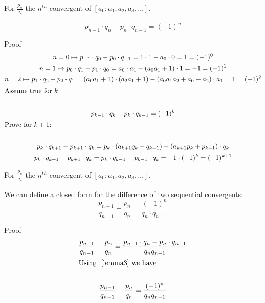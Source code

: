 \documentclass[a4paper]{article}
\begin{document}
    \begin{lemma}
        \label{lemma3}
        For $\frac{p_{n}}{q_n}$ the $n^{th}$ convergent of $[a_0; a_1, a_2, a_3, \dots]$.

        \[
        p_{n-1} \cdot q_n - p_{n} \cdot q_{n-1} = (-1)^n
        \]

        Proof
        \begin{gather*}
            n=0 \mapsto p_{-1} \cdot q_0 - p_{0} \cdot q_{-1} = 1 \cdot 1 - a_0 \cdot 0 = 1 = (-1)^0 \\
            n=1 \mapsto p_{0} \cdot q_1 - p_{1} \cdot q_{0} = a_0 \cdot a_1 - (a_0 a_1 + 1)  \cdot 1 = -1 = (-1)^1 \\
            n=2 \mapsto p_{1} \cdot q_2 - p_{2} \cdot q_{1} = (a_0 a_1 + 1) \cdot (a_2 a_1 + 1)
                        - (a_0 a_1 a_2 + a_0 + a_2)  \cdot a_1 = 1 = (-1)^2 \\

            \shortintertext{Assume true for \( k \)} \\

            p_{k-1} \cdot q_k - p_{k} \cdot q_{k-1} = (-1)^k \\

            \shortintertext{Prove for  \( k+1 \):} \\

            p_{k} \cdot q_{k+1} - p_{k+1} \cdot q_{k} = p_{k} \cdot (a_{k+1} q_{k} + q_{k-1}) - (a_{k+1} p_{k} + p_{k-1}) \cdot q_{k} \\
            p_{k} \cdot q_{k+1} - p_{k+1} \cdot q_{k} = p_{k} \cdot q_{k-1} - p_{k-1} \cdot q_{k} = -1 \cdot (-1)^k = (-1)^{k+1} \\
        \end{gather*}
    \end{lemma}

    \begin{lemma}
        \label{lemma2}
        For $\frac{p_{n}}{q_n}$ the $n^{th}$ convergent of $[a_0; a_1, a_2, a_3, \dots]$.

        We can define a closed form for the difference of two sequential convergents:
        \[
        \frac{p_{n-1}}{q_{n-1}} - \frac{p_{n}}{q_n} = \frac{(-1)^n}{q_n \cdot q_{n-1}}
        \]

        Proof
        \begin{gather*}
            \frac{p_{n-1}}{q_{n-1}} - \frac{p_{n}}{q_n}
            = \frac{p_{n-1} \cdot q_n - p_{n} \cdot q_{n-1}}{q_{n} q_{n-1}}  \\
            \shortintertext{Using ~\ref{lemma3} we have} \\
            \frac{p_{n-1}}{q_{n-1}} - \frac{p_{n}}{q_n} = \frac{(-1)^n}{q_{n} q_{n-1}}
        \end{gather*}
    \end{lemma}
\end{document}
